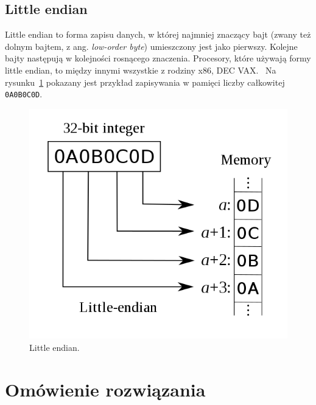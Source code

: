 \documentclass[12pt,a4paper,titlepage]{article}
\begin{document}
\subsection{Little endian}
\noindent\begin{minipage}{0.6\textwidth}
Little endian to forma zapisu danych, w której najmniej znaczący bajt (zwany też dolnym bajtem, z ang. \textit{low-order byte}) umieszczony jest jako pierwszy. Kolejne bajty następują w kolejności rosnącego znaczenia. Procesory, które używają formy little endian, to między innymi wszystkie z rodziny x86, DEC VAX.~\cite{little-endian} Na rysunku~\ref{fig:little-endian} pokazany jest przykład zapisywania w pamięci liczby całkowitej \texttt{0A0B0C0D}.

\end{minipage}
\hfill
\noindent\begin{minipage}{0.35\textwidth}
\begin{figure}[H]
\centering
\includegraphics[width=\textwidth]{images/little-endian.png}
\caption{Little endian.}
\label{fig:little-endian}
\end{figure}
\end{minipage}

\newpage
\section{Omówienie rozwiązania}
\end{document}
